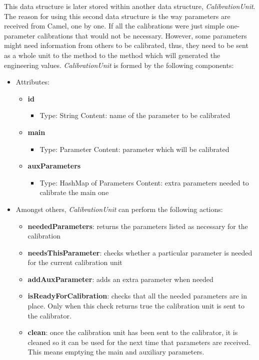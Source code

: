 This data structure is later stored within another data structure, \emph{CalibrationUnit}. The reason for using this second data structure is the way parameters are received from Camel, one by one. If all the calibrations were just simple one-parameter calibrations that would not be necessary. However, some parameters might need information from others to be calibrated, thus, they need to be sent as a whole unit to the method to the method which will generated the engineering values. \emph{CalibrationUnit} is formed by the following components:

\begin{itemize}
\item Attributes:
	\begin{itemize}
		\item \textbf{id}
			\begin{itemize}
				\item Type: String
				\itme Content: name of the parameter to be calibrated
			\end{itemize}
		\item \textbf{main}
			\begin{itemize}
				\item Type: Parameter
				\itme Content: parameter which will be calibrated
			\end{itemize}				
		\item \textbf{auxParameters}
			\begin{itemize}
				\item Type: HashMap of Parameters
				\itme Content: extra parameters needed to calibrate the main one
			\end{itemize}												
		
	\end{itemize}
	
	\item Amongst others, \emph{CalibrationUnit} can perform the following actions:
	\begin{itemize}
		\item \textbf{neededParameters}: returns the parameters listed as necessary for the calibration
		\item \textbf{needsThisParameter}: checks whether a particular parameter is needed for the current calibration unit
		\item \textbf{addAuxParameter}: adds an extra parameter when needed
		\item \textbf{isReadyForCalibration}: checks that all the needed parameters are in place. Only when this check returns true the calibration unit is sent to the calibrator.
		\item \textbf{clean}: once the calibration unit has been sent to the calibrator, it is cleaned so it can be used for the next time that parameters are received. This means emptying the main and auxiliary parameters.
	\end{itemize}

\end{itemize}


